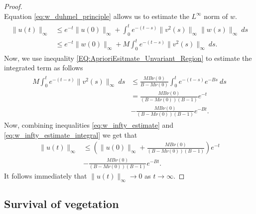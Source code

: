 \documentclass[11pt, a4paper]{article}
\theoremstyle{break}
\theoremstyle{break}
\theoremstyle{break}
\theoremstyle{break}
\theoremstyle{break}
\theoremstyle{break}
\theoremstyle{break}
\begin{document}
\begin{proof}
\begin{equation}
    \end{equation}
    Equation \eqref{eq:w_duhmel_principle} allows us to estimate the $L^\infty$ norm of $w$.
    \begin{align}
        \label{eq:w_infty_estimate}
        \begin{split}
            \|u(t)\|_\infty 
            &\leq e^{-t}\|u(0)\|_\infty + \int_0^t e^{-(t-s)} \|v^2(s)\|_\infty \|w(s)\|_\infty\:ds \\
            &\leq e^{-t}\|w(0)\|_\infty + M \int_0^t e^{-(t-s)} \|v^2(s)\|_\infty \:ds.
        \end{split}
    \end{align}
    Now, we use inequality \eqref{EQ:AprioriEsitmate_Unvariant_Region} to estimate the integrated term as follows
    \begin{align}
        \label{eq:w_infty_estimate_integral}
        \begin{split}
            M \int_0^t e^{-(t-s)} \|v^2(s)\|_\infty \:ds 
            &\leq
            \frac{M B \nu(0)}{B-M \nu(0)} \int_0^t e^{-(t-s)} e^{-Bs}\:ds \\
            &= 
            \frac{M B \nu(0)}{(B-M\nu(0))(B-1)} e^{-t} \\
            &- 
            \frac{M B \nu(0)}{(B - M \nu(0))(B-1)} e^{-Bt}.
        \end{split}
    \end{align}
    Now, combining inequalities \eqref{eq:w_infty_estimate} and \eqref{eq:w_infty_estimate_integral} we get that
    \begin{align*}
        \|u(t)\|_\infty 
        &\leq \left( \|u(0)\|_\infty + \frac{M B \nu(0)}{(B-M\nu(0))(B-1)} \right) e^{-t} \\
        &- \frac{M B \nu(0)}{(B-M\nu(0))(B-1)} e^{-Bt}.
    \end{align*}
    It follows immediately that $\|u(t)\|_\infty \rightarrow 0$ as $t \rightarrow \infty$.
\end{proof}

\subsection{Survival of vegetation}
\end{document}
